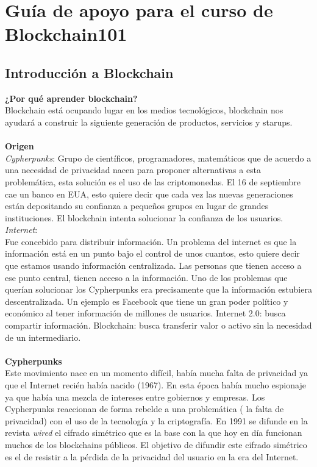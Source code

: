 \documentclass[a4paper,12pt]{/home/armando/Documentos/Cursos/LaTeX/Plantillas/lib/pub}
\begin{document}
\putLogo
\protecoTitle
\section{Guía de apoyo para el curso de Blockchain101}
\subsection{Introducción a Blockchain}
\textbf{¿Por qué aprender blockchain?}\\
Blockchain está ocupando lugar en los medios tecnológicos, blockchain nos ayudará a construir la siguiente generación de productos, servicios y starups.\\\\
\textbf{Origen}\\
\textit{Cypherpunks}: Grupo de científicos, programadores, matemáticos que de acuerdo a una necesidad de privacidad nacen para proponer alternativas a esta problemática, esta solución es el uso de las criptomonedas. El 16 de septiembre cae un banco en EUA, esto quiere decir que cada vez las nuevas generaciones están depositando su confianza a pequeños grupos en lugar de grandes instituciones. El blockchain intenta solucionar la confianza de los usuarios.
\textit{Internet}:\\
Fue concebido para distribuir información. Un problema del internet es que la información está en un punto bajo el control de unos cuantos, esto quiere decir que estamos usando información centralizada. Las personas que tienen acceso a ese punto central, tienen acceso a la información. Uno de los problemas que querían solucionar los Cypherpunks era precisamente que la información estubiera descentralizada. Un ejemplo es Facebook que tiene un gran poder político y económico al tener información de millones de usuarios.
Internet 2.0: busca compartir información.
Blockchain: busca transferir valor o activo sin la necesidad de un intermediario.\\\\
\textbf{Cypherpunks}\\
Este movimiento nace en un momento difícil, había mucha falta de privacidad ya que el Internet recién había nacido (1967). En esta época había mucho espionaje ya que había una mezcla de intereses entre gobiernos y empresas.
Los Cypherpunks reaccionan de forma rebelde a una problemática ( la falta de privacidad) con el uso de la tecnología y la criptografía.
En 1991 se difunde en la revista \textit{wired} el cifrado simétrico que es la base con la que hoy en día funcionan muchos de los blockchains públicos. El objetivo de difundir este cifrado simétrico es el de resistir a la pérdida de la privacidad del usuario en la era del Internet.\newpage
\end{document}
